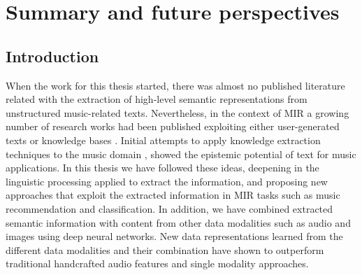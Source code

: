
\chapter{Summary and future perspectives}
\label{sec:conclusion}

\section{Introduction}

When the work for this thesis started, there was almost no published literature related with the extraction of high-level semantic representations from unstructured music-related texts. Nevertheless, in the context of MIR a growing number of research works had been published exploiting either user-generated texts \citep{Celma2006,lamere2008social,Whitman2002,Knees2013} or knowledge bases \citep{sordo1788,Celma:ISWC06,dbrec1,Ostuni2013}. Initial attempts to apply knowledge extraction techniques to the music domain \citep{Tata2010,Knees2011,Sordo2012}, showed the epistemic potential of text for music applications. In this thesis we have followed these ideas, deepening in the linguistic processing applied to extract the information, and proposing new approaches that exploit the extracted information in MIR tasks such as music recommendation and classification. In addition, we have combined extracted semantic information with content from other data modalities such as audio and images using deep neural networks. New data representations learned from the different data modalities and their combination have shown to outperform traditional handcrafted audio features and single modality approaches.

